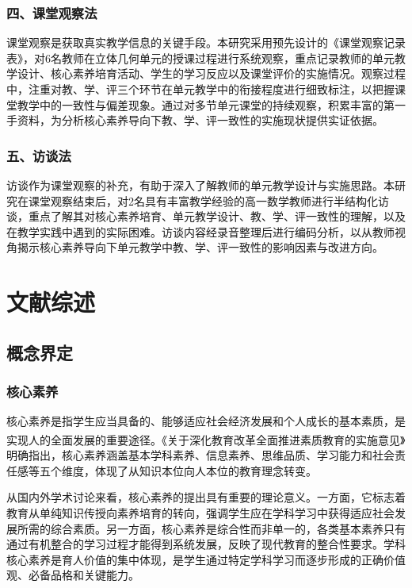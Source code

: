 \documentclass[UTF8,a4paper,12pt,twoside]{ctexart}
\begin{document}
\subsubsection{四、课堂观察法}
课堂观察是获取真实教学信息的关键手段。本研究采用预先设计的《课堂观察记录表》，对6名教师在立体几何单元的授课过程进行系统观察，重点记录教师的单元教学设计、核心素养培育活动、学生的学习反应以及课堂评价的实施情况。观察过程中，注重对教、学、评三个环节在单元教学中的衔接程度进行细致标注，以把握课堂教学中的一致性与偏差现象。通过对多节单元课堂的持续观察，积累丰富的第一手资料，为分析核心素养导向下教、学、评一致性的实施现状提供实证依据。

\subsubsection{五、访谈法}
访谈作为课堂观察的补充，有助于深入了解教师的单元教学设计与实施思路。本研究在课堂观察结束后，对2名具有丰富教学经验的高一数学教师进行半结构化访谈，重点了解其对核心素养培育、单元教学设计、教、学、评一致性的理解，以及在教学实践中遇到的实际困难。访谈内容经录音整理后进行编码分析，以从教师视角揭示核心素养导向下单元教学中教、学、评一致性的影响因素与改进方向。

\section{文献综述}

\subsection{概念界定}

\subsubsection{核心素养}

核心素养是指学生应当具备的、能够适应社会经济发展和个人成长的基本素质，是实现人的全面发展的重要途径\textsuperscript{\cite{shi2017}}。《关于深化教育改革全面推进素质教育的实施意见》明确指出，核心素养涵盖基本学科素养、信息素养、思维品质、学习能力和社会责任感等五个维度，体现了从知识本位向人本位的教育理念转变。

从国内外学术讨论来看，核心素养的提出具有重要的理论意义。一方面，它标志着教育从单纯知识传授向素养培育的转向，强调学生应在学科学习中获得适应社会发展所需的综合素质。另一方面，核心素养是综合性而非单一的，各类基本素养只有通过有机整合的学习过程才能得到系统发展，反映了现代教育的整合性要求。学科核心素养是育人价值的集中体现，是学生通过特定学科学习而逐步形成的正确价值观、必备品格和关键能力。
\end{document}
